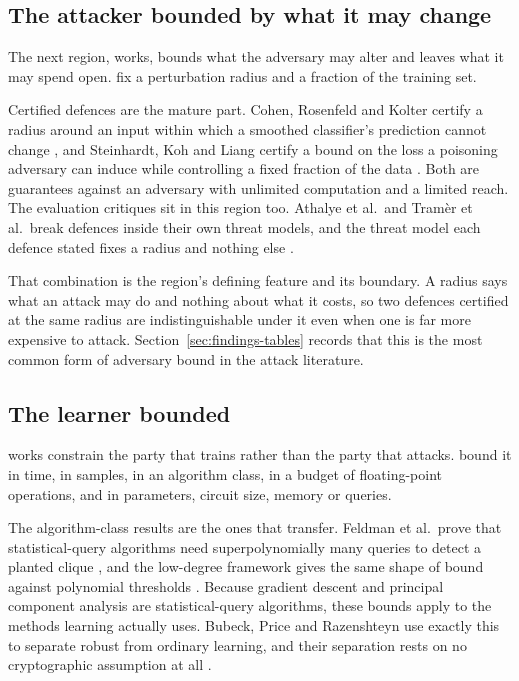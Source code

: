 \subsection{The attacker bounded by what it may change}

The next region, \AttackerCapability{} works, bounds what the adversary may alter
and leaves what it may spend open. \AttackerPerturbAll{} fix a perturbation radius
and \AttackerCorruptAll{} a fraction of the training set.

Certified defences are the mature part. Cohen, Rosenfeld and Kolter certify a radius
around an input within which a smoothed classifier's prediction cannot change
\cite{CRK19}, and Steinhardt, Koh and Liang certify a bound on the loss a poisoning
adversary can induce while controlling a fixed fraction of the data \cite{SKL17}.
Both are guarantees against an adversary with unlimited computation and a limited
reach. The evaluation critiques sit in this region too. Athalye et al.\ and
Tram\`er et al.\ break defences inside their own threat models, and the threat
model each defence stated fixes a radius and nothing else \cite{ACW18,TCBM20}.

That combination is the region's defining feature and its boundary. A radius says
what an attack may do and nothing about what it costs, so two defences certified at
the same radius are indistinguishable under it even when one is far more expensive
to attack. Section~\ref{sec:findings-tables} records that this is the most common
form of adversary bound in the attack literature.

\subsection{The learner bounded}

\LearnerBound{} works constrain the party that trains rather than the party that
attacks. \LearnerTime{} bound it in time, \LearnerSamples{} in samples,
\LearnerClass{} in an algorithm class, \LearnerFlops{} in a budget of
floating-point operations, and \LearnerOther{} in parameters, circuit size, memory
or queries.

The algorithm-class results are the ones that transfer. Feldman et al.\ prove that
statistical-query algorithms need superpolynomially many queries to detect a planted
clique \cite{FGRVX17}, and the low-degree framework gives the same shape of bound
against polynomial thresholds \cite{Wei25,BBHLS21}. Because gradient descent and
principal component analysis are statistical-query algorithms, these bounds apply to
the methods learning actually uses. Bubeck, Price and Razenshteyn use exactly this
to separate robust from ordinary learning, and their separation rests on no
cryptographic assumption at all \cite{BPR19}.

